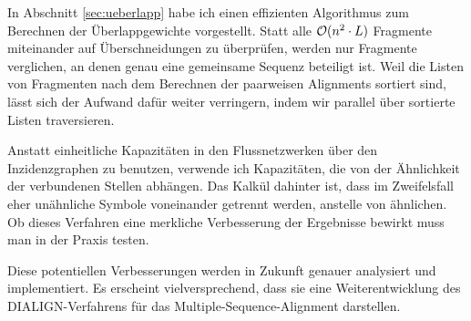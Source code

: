 In Abschnitt \ref{sec:ueberlapp} habe ich einen effizienten Algorithmus zum Berechnen der Überlappgewichte vorgestellt. Statt alle $\mathcal{O}(n^2\cdot L)$ Fragmente miteinander auf Überschneidungen zu überprüfen, werden nur Fragmente verglichen, an denen genau eine gemeinsame Sequenz beteiligt ist. Weil die Listen von Fragmenten nach dem Berechnen der paarweisen Alignments sortiert sind, lässt sich der Aufwand dafür weiter verringern, indem wir parallel über sortierte Listen traversieren.

Anstatt einheitliche Kapazitäten in den Flussnetzwerken über den Inzidenzgraphen zu benutzen, verwende ich Kapazitäten, die von der Ähnlichkeit der verbundenen Stellen abhängen. Das Kalkül dahinter ist, dass im Zweifelsfall eher unähnliche Symbole voneinander getrennt werden, anstelle von ähnlichen. Ob dieses Verfahren eine merkliche Verbesserung der Ergebnisse bewirkt muss man in der Praxis testen.

Diese potentiellen Verbesserungen werden in Zukunft genauer analysiert und implementiert. Es erscheint vielversprechend, dass sie eine Weiterentwicklung des DIALIGN-Verfahrens für das Multiple-Sequence-Alignment darstellen.













